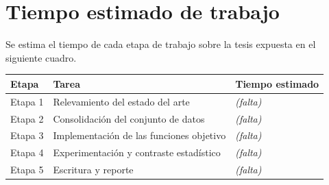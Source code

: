 %
\chapter{Tiempo estimado de trabajo}

Se estima el tiempo de cada etapa de trabajo sobre la tesis expuesta en el siguiente cuadro.

\begin{center}
\begin{tabular}{@{}lll@{}}
  \toprule
  \textbf{Etapa} & \textbf{Tarea} & \textbf{Tiempo estimado} \\
  \midrule
  Etapa 1 & Relevamiento del estado del arte        & \textit{(falta)} \\
  Etapa 2 & Consolidación del conjunto de datos     & \textit{(falta)} \\
  Etapa 3 & Implementación de las funciones objetivo & \textit{(falta)} \\
  Etapa 4 & Experimentación y contraste estadístico & \textit{(falta)} \\
  Etapa 5 & Escritura y reporte                     & \textit{(falta)} \\
  \bottomrule
\end{tabular}
\end{center}

